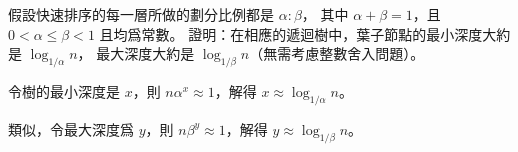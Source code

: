 \startEXERCISE
假設快速排序的每一層所做的劃分比例都是 $\alpha : \beta$，
其中 $\alpha+\beta=1$，且 $0<\alpha\le \beta < 1$ 且均爲常數。
證明：在相應的遞迴樹中，葉子節點的最小深度大約是 $\log_{1/\alpha}{n}$，
最大深度大約是 $\log_{1/\beta}{n}$（無需考慮整數舍入問題）。
\stopEXERCISE

\startANSWER
令樹的最小深度是 $x$，則 $n\alpha^x\approx 1$，解得 $x\approx\log_{1/\alpha}{n}$。

類似，令最大深度爲 $y$，則 $n\beta^y\approx 1$，解得 $y\approx\log_{1/\beta}{n}$。
\stopANSWER
